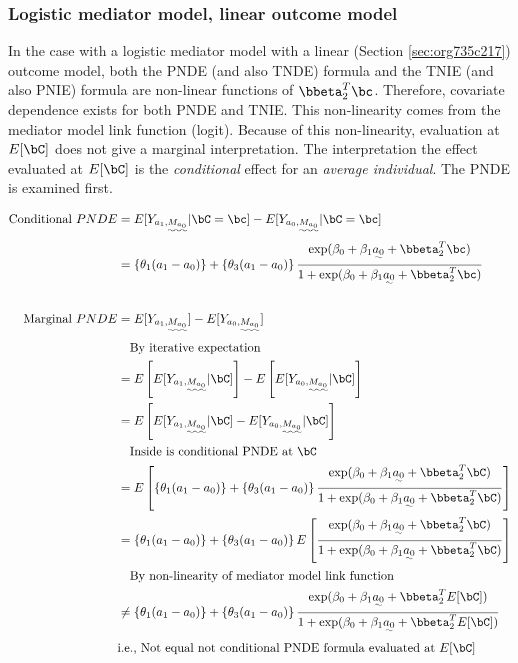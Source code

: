 \documentclass[10pt]{article}
\begin{document}
\subsubsection{Logistic mediator model, linear outcome model}
\label{sec:orgb89b066}
In the case with a logistic mediator model with a linear (Section \ref{sec:org735c217}) outcome model, both the PNDE (and also TNDE) formula and the TNIE (and also PNIE) formula are non-linear functions of \(\bbeta_{2}^{T}\bc\). Therefore, covariate dependence exists for both PNDE and TNIE. This non-linearity comes from the mediator model link function (logit). Because of this non-linearity, evaluation at \(E[\bC]\) does not give a marginal interpretation. The interpretation the effect evaluated at \(E[\bC]\) is the \emph{conditional} effect for an \emph{average individual}. The PNDE is examined first.

\begin{align*}
  \text{Conditional }PNDE
  &= E[Y_{a_{1},\uwave{M_{a_{0}}}} | \bC = \bc] - E[Y_{a_{0},\uwave{M_{a_{0}}}} | \bC = \bc]\\
  &= \left\{\theta_{1}(a_{1} - a_{0}) \right\} + \left\{\theta_{3}(a_{1} - a_{0}) \right\}
    \frac
    {    \exp(\beta_{0} + \beta_{1}\uwave{a_{0}} + \bbeta_{2}^{T}\bc)}
    {1 + \exp(\beta_{0} + \beta_{1}\uwave{a_{0}} + \bbeta_{2}^{T}\bc)}\\
  \\
  \text{Marginal }PNDE
  &= E[Y_{a_{1},\uwave{M_{a_{0}}}}] - E[Y_{a_{0},\uwave{M_{a_{0}}}}]\\
  &~~~\text{By iterative expectation}\\
  &= E \left[ E[Y_{a_{1},\uwave{M_{a_{0}}}} | \bC] \right] - E \left[ E[Y_{a_{0},\uwave{M_{a_{0}}}} | \bC] \right]\\
  &= E \left[ E[Y_{a_{1},\uwave{M_{a_{0}}}} | \bC] - E[Y_{a_{0},\uwave{M_{a_{0}}}} | \bC] \right]\\
  &~~~\text{Inside is conditional PNDE at }\bC\\
  &= E \left[ \left\{\theta_{1}(a_{1} - a_{0}) \right\} + \left\{\theta_{3}(a_{1} - a_{0}) \right\}
    \frac
    {    \exp(\beta_{0} + \beta_{1}\uwave{a_{0}} + \bbeta_{2}^{T}\bC)}
    {1 + \exp(\beta_{0} + \beta_{1}\uwave{a_{0}} + \bbeta_{2}^{T}\bC)} \right]\\
  &= \left\{\theta_{1}(a_{1} - a_{0}) \right\} + \left\{\theta_{3}(a_{1} - a_{0}) \right\}
    E \left[ \frac
    {    \exp(\beta_{0} + \beta_{1}\uwave{a_{0}} + \bbeta_{2}^{T}\bC)}
    {1 + \exp(\beta_{0} + \beta_{1}\uwave{a_{0}} + \bbeta_{2}^{T}\bC)} \right]\\
  &~~~\text{By non-linearity of mediator model link function}\\
  &\ne \left\{\theta_{1}(a_{1} - a_{0}) \right\} + \left\{\theta_{3}(a_{1} - a_{0}) \right\}
    \frac
    {    \exp(\beta_{0} + \beta_{1}\uwave{a_{0}} + \bbeta_{2}^{T}E[\bC])}
    {1 + \exp(\beta_{0} + \beta_{1}\uwave{a_{0}} + \bbeta_{2}^{T}E[\bC])}\\
  &\text{i.e., Not equal not conditional PNDE formula evaluated at }E[\bC]\\
\end{align*}
\end{document}

